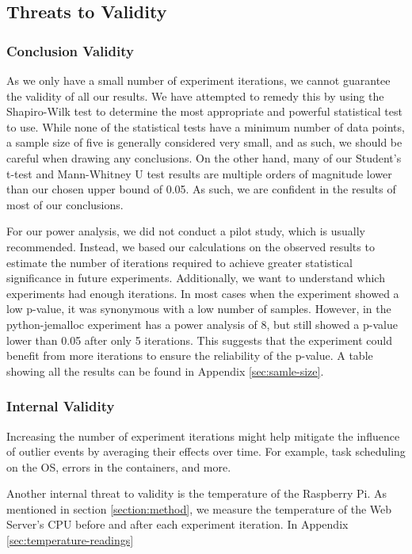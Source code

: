 \documentclass[main.tex]{subfiles}
\begin{document}
\subsection{Threats to Validity}
\label{section:threats-to-validity}

\subsubsection{Conclusion Validity}
As we only have a small number of experiment iterations, we cannot guarantee the validity of all our results. We have attempted to remedy this by using the Shapiro-Wilk test to determine the most appropriate and powerful statistical test to use. While none of the statistical tests have a minimum number of data points, a sample size of five is generally considered very small, and as such, we should be careful when drawing any conclusions. On the other hand, many of our Student's t-test and Mann-Whitney U test results are multiple orders of magnitude lower than our chosen upper bound of 0.05. As such, we are confident in the results of most of our conclusions.

For our power analysis, we did not conduct a pilot study, which is usually recommended. Instead, we based our calculations on the observed results to estimate the number of iterations required to achieve greater statistical significance in future experiments. Additionally, we want to understand which experiments had enough iterations. In most cases when the experiment showed a low p-value, it was synonymous with a low number of samples. However, in the python-jemalloc experiment has a power analysis of 8, but still showed a p-value lower than 0.05 after only 5 iterations. This suggests that the experiment could benefit from more iterations to ensure the reliability of the p-value. A table showing all the results can be found in Appendix \ref{sec:samle-size}.

\subsubsection{Internal Validity}
Increasing the number of experiment iterations might help mitigate the influence of outlier events by averaging their effects over time. For example, task scheduling on the OS, errors in the containers, and more.

Another internal threat to validity is the temperature of the Raspberry Pi. As mentioned in section \ref{section:method}, we measure the temperature of the Web Server's CPU before and after each experiment iteration. In Appendix \ref{sec:temperature-readings}
\end{document}
